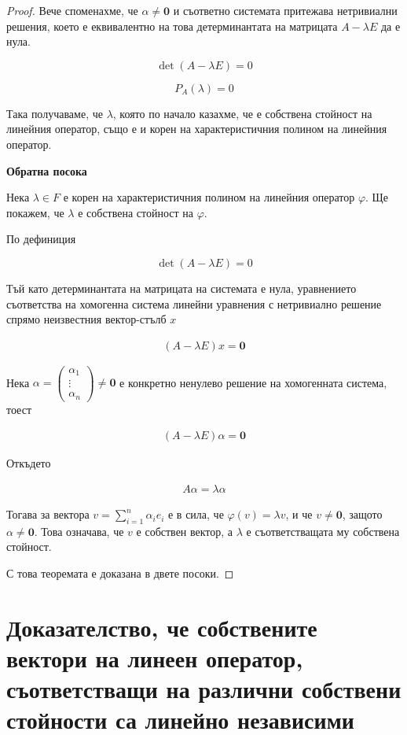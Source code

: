 \documentclass{scrartcl}
\begin{document}
\begin{FlushLeft}
\begin{proof}
Вече споменахме, че $\alpha \ne \mathbf{0}$ и съответно системата притежава нетривиални решения, което е еквивалентно на това детерминантата на матрицата $A - \lambda E$ да е нула.

$$\det{(A - \lambda E)} = 0$$

$$P_A(\lambda) = 0$$

Така получаваме, че $\lambda$, която по начало казахме, че е собствена стойност на линейния оператор, също е и корен на характеристичния полином на линейния оператор.

\textbf{Обратна посока}

Нека $\lambda \in F$ е корен на характеристичния полином на линейния оператор $\varphi$. Ще покажем, че $\lambda$ е собствена стойност на $\varphi$.

По дефиниция

$$\det(A - \lambda E) = 0$$

Тъй като детерминантата на матрицата на системата е нула, уравнението съответства на хомогенна система линейни уравнения с нетривиално решение спрямо неизвестния вектор-стълб $x$

\[
\begin{array}{|l}
    (A - \lambda E)x = \mathbf{0}
\end{array}
\]

Нека $\alpha = \begin{pmatrix}
    \alpha_1\\
    \vdots\\
    \alpha_n
\end{pmatrix} \neq \mathbf{0}$ е конкретно ненулево решение на хомогенната система, тоест

\[
\begin{array}{|l}
    (A - \lambda E)\alpha = \mathbf{0}
\end{array}
\]

Откъдето

\[
\begin{array}{l}
    A \alpha = \lambda \alpha
\end{array}
\]

Тогава за вектора $v = \sum_{i=1}^n \alpha_i e_i$ е в сила, че $\varphi(v) = \lambda v$, и че $v \ne \mathbf{0}$, защото $\alpha \ne \mathbf{0}$. Това означава, че $v$ е собствен вектор, а $\lambda$ е съответстващата му собствена стойност.

С това теоремата е доказана в двете посоки.
\end{proof}

\section{Доказателство, че собствените вектори на линеен
оператор, съответстващи на различни собствени стойности са линейно независими}


\end{FlushLeft}
\end{document}
